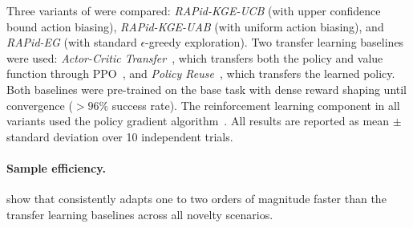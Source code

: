 Three variants of \RAPidLearn{} were compared: \emph{RAPid-KGE-UCB} (with upper confidence bound action biasing), \emph{RAPid-KGE-UAB} (with uniform action biasing), and \emph{RAPid-EG} (with standard $\epsilon$-greedy exploration). Two transfer learning baselines were used: \emph{Actor-Critic Transfer}~\citep{clegg2017haptics}, which transfers both the policy and value function through PPO~\citep{schulman2017proximal}, and \emph{Policy Reuse}~\citep{glatt2017policy}, which transfers the learned policy. Both baselines were pre-trained on the base task with dense reward shaping until convergence ($>96\%$ success rate). The reinforcement learning component in all \RAPidLearn{} variants used the policy gradient algorithm~\citep{williams1992reinforce}. All results are reported as mean $\pm$ standard deviation over 10 independent trials.

\paragraph{Sample efficiency.}  show that \RAPidLearn{} consistently adapts one to two orders of magnitude faster than the transfer learning baselines across all novelty scenarios.

